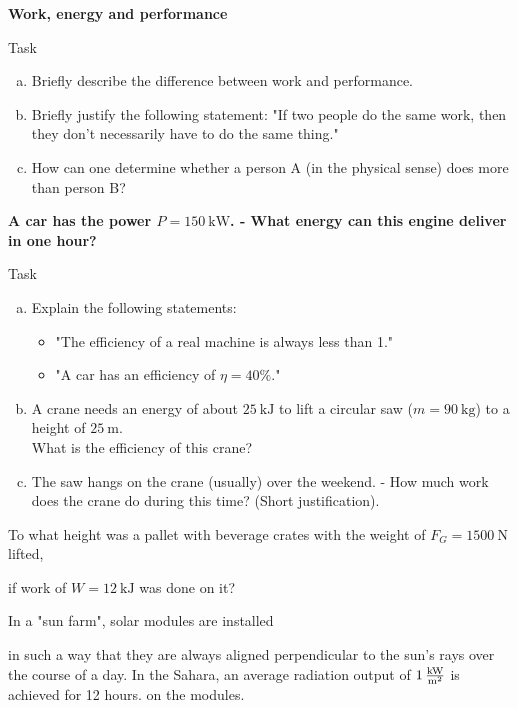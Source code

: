 \documentclass[a4paper]{article}
\begin{document}
	{\bf Work, energy and performance }\\
	\begin{enumerate}[1.]
		{\bf \item Task}
		\begin{enumerate}[a)]
			\item Briefly describe the difference between work and performance.
			\item Briefly justify the following statement: "If two people do the same work, then they don't necessarily have to do the same thing."
			\item How can one determine whether a person A (in the physical sense)
			does more than person B?
		\end{enumerate}
		
		{\item \bf A car has the power $P=\SI{150}{\kilo\watt}$. - What energy can this engine deliver in one hour?}
		
		{\bf \item Task }
		\begin{enumerate}[a)]
			\item Explain the following statements:
			\begin{itemize}
				\item "The efficiency of a real machine is always less than 1."
				\item "A car has an efficiency of $\eta = 40 \%$."
			\end{itemize}
			\item A crane needs an energy of about $\SI{25}{\kilo\joule}$ to lift a circular saw ($m=\SI{90}{\kilogram}$) to a height of $\SI{25}{\meter}$. \\
			What is the efficiency of this crane?
			\item The saw hangs on the crane (usually) over the weekend. - How much work does the crane do during this time? (Short justification).
		\end{enumerate}
		
		
		
		{\bf \item To what height was a pallet with beverage crates with the weight of $F_G=\SI{1500}{\newton}$
			lifted,} if work of $W=\SI{12}{\kilo\joule}$ was done on it?
		
		{\bf \item In a "sun farm", solar modules are installed} in such a way that they are always aligned perpendicular to the sun's rays over the course of a day. In the Sahara, an average radiation output of $ \SI{1}{\kilo\watt\over{\meter^2}} $ is achieved for 12 hours.  on the modules.
			

\end{enumerate}
\end{document}
